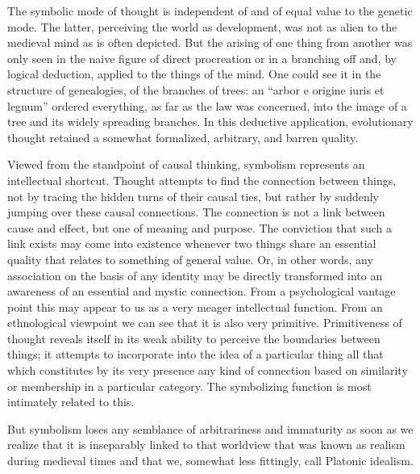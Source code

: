 The symbolic mode of thought is independent of and of equal value to the
genetic mode. The latter, perceiving the world as development, was not
as alien to the medieval mind as is often depicted. But the arising of
one thing from another was only seen in the naive figure of direct
procreation or in a branching off and, by logical deduction, applied to
the things of the mind. One could see it in the structure of
genealogies, of the branches of trees: an ``arbor e origine iuris et
legnum'' ordered everything, as far as the law was concerned, into the
image of a tree and its widely spreading branches. In this deductive
application, evolutionary thought retained a somewhat formalized,
arbitrary, and barren quality.

Viewed from the standpoint of causal thinking, symbolism represents an
intellectual shortcut. Thought attempts to find the connection between
things, not by tracing the hidden turns of their causal ties, but rather
by suddenly jumping over these causal connections. The connection is not
a link between cause and effect, but one of meaning and purpose. The
conviction that such a link exists may come into existence whenever two
things share an essential quality that relates to something of general
value. Or, in other words, any association on the basis of any identity
may be directly transformed into an awareness of an essential and mystic
connection. From a psychological vantage point this may appear to us as
a very meager intellectual function. From an ethnological viewpoint we
can see that it is also very primitive. Primitiveness of thought reveals
itself in its weak ability to perceive the boundaries between things; it
attempts to incorporate into the idea of a particular thing all that
which constitutes by its very presence any kind of connection based on
similarity or membership in a particular category. The symbolizing
function is most intimately related to this.

But symbolism loses any semblance of arbitrariness and immaturity as
soon as we realize that it is inseparably linked to that worldview that
was known as realism during medieval times and that we, somewhat less
fittingly, call Platonic idealism.

